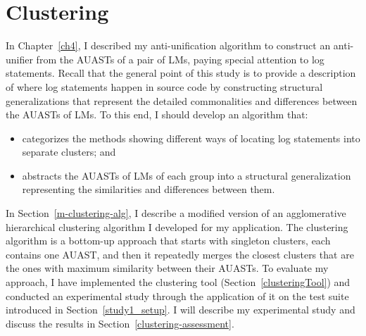 \chapter{Clustering}  \label{clustering}
In Chapter~\ref{ch4}, I described my anti-unification algorithm to construct an anti-unifier from the AUASTs of a pair of LMs, paying special attention to log statements. Recall that the general point of this study is to provide a description of where log statements happen in source code by constructing structural generalizations that represent the detailed commonalities and differences between the AUASTs of LMs. To this end, I should develop an algorithm that:
\begin{itemize} [leftmargin=.5in]
\item categorizes the methods showing different ways of locating log statements into separate clusters; and
\item abstracts the AUASTs of LMs of each group into a structural generalization representing the similarities and differences between them.
\end{itemize}

In Section~\ref{m-clustering-alg}, I describe a modified version of an agglomerative hierarchical clustering algorithm I developed for my application. The clustering algorithm is a bottom-up approach that starts with singleton clusters, each contains one AUAST, and then it repeatedly merges the closest clusters that are the ones with maximum similarity between their AUASTs. To evaluate my approach, I have implemented the clustering tool (Section~\ref{clusteringTool}) and conducted an experimental study through the application of it on the test suite introduced in Section~\ref{study1_setup}. I will describe my experimental study and discuss the results in Section~\ref{clustering-assessment}.




